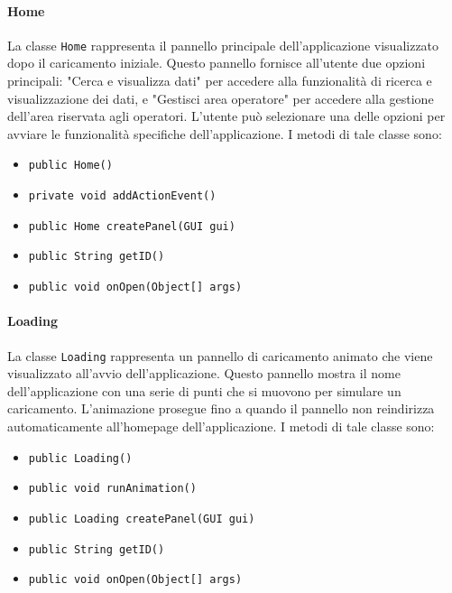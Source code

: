 \paragraph{Home}
La classe \texttt{Home} rappresenta il pannello principale dell'applicazione visualizzato dopo il caricamento iniziale.
Questo pannello fornisce all'utente due opzioni principali: "Cerca e visualizza dati" per accedere alla funzionalità di ricerca e visualizzazione dei dati, e "Gestisci area operatore" per accedere alla gestione dell'area riservata agli operatori.
L'utente può selezionare una delle opzioni per avviare le funzionalità specifiche dell'applicazione.
I metodi di tale classe sono:
\begin{itemize}
    \item \texttt{public Home()}
    \item \texttt{private void addActionEvent()}
    \item \texttt{public Home createPanel(GUI gui)}
    \item \texttt{public String getID()}
    \item \texttt{public void onOpen(Object[] args)}
\end{itemize}

\paragraph{Loading}
La classe \texttt{Loading} rappresenta un pannello di caricamento animato che viene visualizzato all'avvio dell'applicazione.
Questo pannello mostra il nome dell'applicazione con una serie di punti che si muovono per simulare un caricamento. 
L'animazione prosegue fino a quando il pannello non reindirizza automaticamente all'homepage dell'applicazione.
I metodi di tale classe sono:
\begin{itemize}
    \item \texttt{public Loading()}
    \item \texttt{public void runAnimation()}
    \item \texttt{public Loading createPanel(GUI gui)}
    \item \texttt{public String getID()}
    \item \texttt{public void onOpen(Object[] args)}
\end{itemize}

